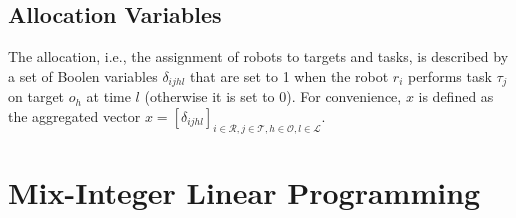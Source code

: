 \documentclass[]{interact}
\theoremstyle{plain}%
\theoremstyle{definition}
\theoremstyle{remark}
\begin{document}
\subsection{Allocation Variables}
The allocation, i.e., the assignment of robots to targets and tasks, is described by a set of Boolen variables $\delta_{ijhl}$ that are set to 1 when the robot $r_i$ performs task $\tau_j$ on target $o_h$ at time $l$ (otherwise it is set to 0).
For convenience, $x$ is defined as the aggregated vector $x=[\delta_{ijhl}]_{i\in\mathcal{R},j\in\mathcal{T},h\in\mathcal{O},l\in\mathcal{L}}$.

\section{Mix-Integer Linear Programming}
\end{document}
